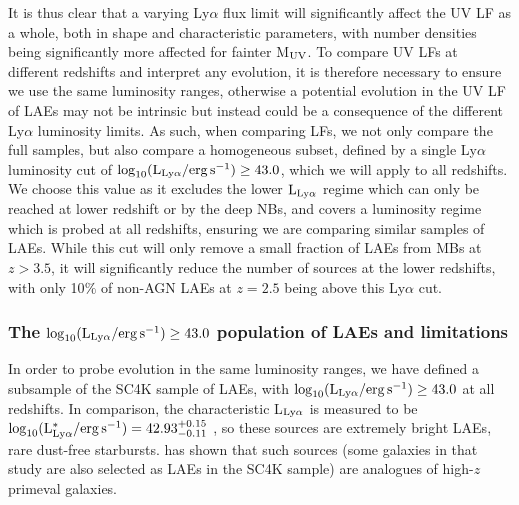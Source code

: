 \documentclass[a4paper,fleqn,usenatbib]{mnras}
\begin{document}
It is thus clear that a varying Ly$\alpha$ flux limit will significantly affect the UV LF as a whole, both in shape and characteristic parameters, with number densities being significantly more affected for fainter M$_{\rm UV}$. To compare UV LFs at different redshifts and interpret any evolution, it is therefore necessary to ensure we use the same luminosity ranges, otherwise a potential evolution in the UV LF of LAEs may not be intrinsic but instead could be a consequence of the different Ly$\alpha$ luminosity limits. As such, when comparing LFs, we not only compare the full samples, but also compare a homogeneous subset, defined by a single Ly$\alpha$ luminosity cut of $\log_{10} (\rm L_{Ly\alpha}/erg\,s^{-1}) \geq 43.0$, which we will apply to all redshifts. We choose this value as it excludes the lower ${\rm L_{Ly\alpha}}$ regime which can only be reached at lower redshift or by the deep NBs, and covers a luminosity regime which is probed at all redshifts, ensuring we are comparing similar samples of LAEs. While this cut will only remove a small fraction of LAEs from MBs at $z>3.5$, it will significantly reduce the number of sources at the lower redshifts, with only 10$\%$ of non-AGN LAEs at $z=2.5$ being above this Ly$\alpha$ cut.


\subsubsection{The $\log_{10} (\rm L_{Ly\alpha}/erg\,s^{-1}) \geq 43.0$ population of LAEs and limitations} \label{sec:L43}
In order to probe evolution in the same luminosity ranges, we have defined a subsample of the SC4K sample of LAEs, with $\log_{10} (\rm L_{Ly\alpha}/erg\,s^{-1}) \geq 43.0$ at all redshifts. In comparison, the characteristic L$_{\rm Ly\alpha}$ is measured to be $\log_{10} (\rm L^*_{Ly\alpha}/erg\,s^{-1})=42.93^{+0.15}_{-0.11}$ \citep{Sobral2018}, so these sources are extremely bright LAEs, rare dust-free starbursts. \cite{Amorin2017} has shown that such sources (some galaxies in that study are also selected as LAEs in the SC4K sample) are analogues of high-$z$ primeval galaxies.
\end{document}
